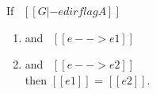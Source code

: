 \begin{comment}
\begin{proof}
By induction on typing relation.
  \begin{itemize}
    \item Cases \rref{typ-int, typ-var, typ-app, typ-sub, typ-abs} are trivial to prove.
    \item Case \rref{typ-anno} requires \cref{lemma:union:value-not-value}.
    \item Case \rref{typ-typeof} requires
    \cref{lemma:union:check-pexpr-ann,lemma:union:check-or-typ,lemma:union:pexpr-inf-typ}.
  \end{itemize}
\end{proof}

\begin{lemma}[Value Decidability]
\label{lemma:union:value-not-value}
$\forall$ $[[e]]$, \ value \ $[[e]]$ \ $\vee$ \ $\neg$ value \ $[[e]]$.
\end{lemma}

\begin{lemma}[check-or-typ]
\label{lemma:union:check-or-typ}
If \ $[[A *s B]]$ \ and \ $[[G |- p <= A \/ B]]$ \ then:
  \begin{enumerate}
    \item either \ $[[G |- p <= A]]$
    \item or \ $[[G |- p <= B]]$
  \end{enumerate}
\end{lemma}

\begin{lemma}[pexpr-inf-typ]
\label{lemma:union:pexpr-inf-typ}
If \ $[[G |- p <= A]]$ \ then:
  \begin{enumerate}
  \item $\exists$ $[[B]]$, \ $[[B <: A]]$
  \item and \ $[[G |- p => B]]$
  \end{enumerate}
\end{lemma}
\end{comment}

\begin{lemma}[Determinism]
\label{lemma:union:determinism}
  If \ $[[G |- e dirflag A]]$
  \begin{enumerate}
  \item and \ $[[e --> e1]]$
  \item and \ $[[e --> e2]]$ \\
  then $[[e1]]$ = $[[e2]]$.
  \end{enumerate}
\end{lemma}

